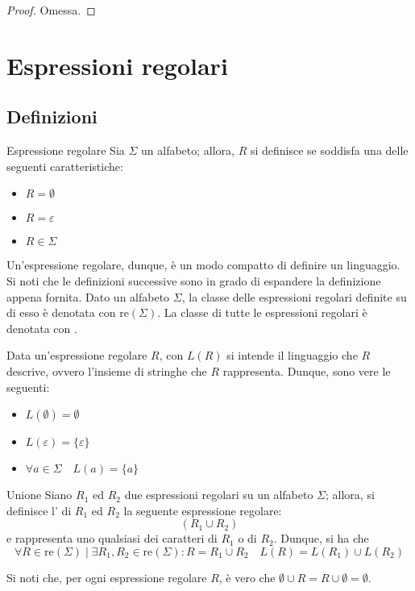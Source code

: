 \documentclass[a4paper, 12pt]{report}
\begin{document}
    \begin{proof}
        Omessa.
    \end{proof}

    \section{Espressioni regolari}

    \subsection{Definizioni}

    \begin{frameddefn}{Espressione regolare}
        Sia $\Sigma$ un alfabeto; allora, $R$ si definisce  se soddisfa una delle seguenti caratteristiche:

        \begin{itemize}
            \item $R = \emptyset$
            \item $R = \varepsilon$
            \item $R \in \Sigma$
        \end{itemize}

        Un'espressione regolare, dunque, è un modo compatto di definire un linguaggio. Si noti che le definizioni successive sono in grado di espandere la definizione appena fornita. Dato un alfabeto $\Sigma$, la classe delle espressioni regolari definite su di esso è denotata con $\mathrm{re}(\Sigma)$. La classe di tutte le espressioni regolari è denotata con \REX.

        Data un'espressione regolare $R$, con $L(R)$ si intende il linguaggio che $R$ descrive, ovvero l'insieme di stringhe che $R$ rappresenta. Dunque, sono vere le seguenti:

        \begin{itemize}
            \item $L(\emptyset) = \emptyset$
            \item $L(\varepsilon) = \{ \varepsilon \}$
            \item $\forall a \in \Sigma \quad L(a) = \{ a\}$
        \end{itemize}
    \end{frameddefn}

    \begin{frameddefn}{Unione}
        Siano $R_1$ ed $R_2$ due espressioni regolari su un alfabeto $\Sigma$; allora, si definisce l' di $R_1$ ed $R_2$ la seguente espressione regolare: $$(R_1 \cup R_2)$$ e rappresenta uno qualsiasi dei caratteri di $R_1$ o di $R_2$. Dunque, si ha che $$\forall R \in \mathrm{re}(\Sigma) \mid \exists R_1, R_2 \in \mathrm{re}(\Sigma) : R = R_1 \cup R_2 \quad L(R) = L(R_1) \cup L(R_2)$$

        Si noti che, per ogni espressione regolare $R$, è vero che $\emptyset \cup R = R \cup \emptyset = \emptyset$.
    \end{frameddefn}
\end{document}
